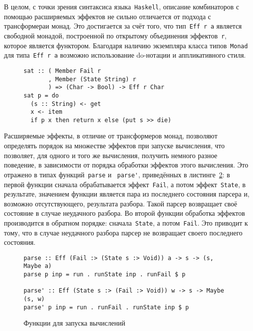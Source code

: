   В целом, с точки зрения синтаксиса языка~\lstinline{Haskell}, описание
  комбинаторов с помощью расширяемых эффектов не сильно отличается от
  подхода с трансформераи монад. Это достигается за счёт того, что
  тип~\lstinline{Eff r a} является свободной монадой, построенной по открытому
  объединения эффектов~\lstinline{r}, которое является функтором. Благодаря
  наличию экземпляра класса типов~\lstinline{Monad} для типа~\lstinline{Eff r a}
  возможно использование do-нотации и аппликативного стиля.

  \begin{figure}[h]
  \begin{lstlisting}
sat :: ( Member Fail r
       , Member (State String) r
       ) => (Char -> Bool) -> Eff r Char
sat p = do
  (s :: String) <- get
  x <- item
  if p x then return x else (put s >> die)
  \end{lstlisting}
  \label{listing:extEffSat}
  \end{figure}

  Расширяемые эффекты, в отличие от трансформеров монад, позволяют определять
  порядок на множестве эффектов при запуске вычисления, что позволяет, для
  одного и того же вычисления, получить немного разное поведение, в зависимости от
  порядка обработки эффектов этого вычисления. Это отражено в
  типах функций~\lstinline{parse} и ~\lstinline{parse'}, приведённых в
  листинге~\ref{listing:extEffparse}: в первой функции сначала обрабатывается
  эффект~\lstinline{Fail}, а потом эффект~\lstinline{State}, в результате,
  значением функции является пара из последнего состояния парсера и, возможно
  отсутствующего, результата разбора. Такой парсер возвращает своё состояние в
  случае неудачного разбора. Во второй функции обработка эффектов
  производится в обратном порядке: сначала~\lstinline{State}, а потом~\lstinline{Fail}.
  Это приводит к тому, что в случае неудачного разбора парсер не возвращает своего
  последнего состояния.

  \begin{figure}[h]
  \begin{lstlisting}
parse :: Eff (Fail :> (State s :> Void)) a -> s -> (s, Maybe a)
parse p inp = run . runState inp . runFail $ p

parse' :: Eff (State s :> (Fail :> Void)) w -> s -> Maybe (s, w)
parse' p inp = run . runFail . runState inp $ p
  \end{lstlisting}
  \caption{Функции для запуска вычислений}
  \label{listing:extEffparse}
  \end{figure}
